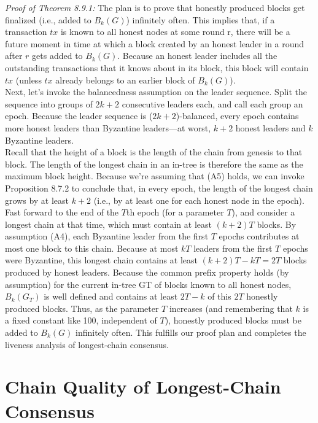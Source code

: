 \noindent
\textit{Proof of Theorem 8.9.1:} The plan is to prove that honestly produced blocks get finalized (i.e.,
added to $B_k(G)$) infinitely often. This implies that, if a transaction $tx$ is known to all honest
nodes at some round r, there will be a future moment in time at which a block created by
an honest leader in a round after $r$ gets added to $B_k(G)$. Because an honest leader includes
all the outstanding transactions that it knows about in its block, this block will contain $tx$
(unless $tx$ already belongs to an earlier block of $B_k(G)$).\\
Next, let’s invoke the balancedness assumption on the leader sequence. Split the sequence
into groups of $2k + 2$ consecutive leaders each, and call each group an epoch. Because the
leader sequence is ($2k+2$)-balanced, every epoch contains more honest leaders than Byzantine
leaders—at worst, $k + 2$ honest leaders and $k$ Byzantine leaders.\\
Recall that the height of a block is the length of the chain from genesis to that block. The
length of the longest chain in an in-tree is therefore the same as the maximum block height.
Because we’re assuming that (A5) holds, we can invoke Proposition 8.7.2 to conclude that, in every epoch, the length of the longest chain grows by at least $k + 2$ (i.e., by at least one for
each honest node in the epoch).\\
Fast forward to the end of the $T$th epoch (for a parameter $T$), and consider a longest
chain at that time, which must contain at least $(k + 2)T$ blocks. By assumption (A4), each
Byzantine leader from the first $T$ epochs contributes at most one block to this chain. Because
at most $kT$ leaders from the first $T$ epochs were Byzantine, this longest chain contains at
least $(k + 2)T - kT = 2T$ blocks produced by honest leaders. Because the common prefix
property holds (by assumption) for the current in-tree GT of blocks known to all honest nodes,
$B_k(G_T)$ is well defined and contains at least $2T - k$ of this $ 2T$ honestly produced blocks.
Thus, as the parameter $T$ increases (and remembering that $k$ is a fixed constant like 100,
independent of $T$), honestly produced blocks must be added to $B_k(G)$ infinitely often. This
fulfills our proof plan and completes the liveness analysis of longest-chain consensus.

\section{Chain Quality of Longest-Chain Consensus}
